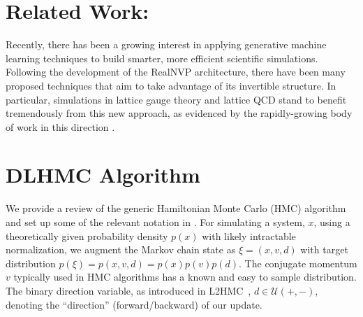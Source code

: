 \documentclass{article} %
\begin{document}
\section{\label{sec:related_work}Related Work:}
Recently, there has been a growing interest in applying generative machine learning techniques to build smarter, more efficient scientific simulations.
%
Following the development of the RealNVP \citep{dinhRealNVP} architecture, there have been many proposed techniques that aim to take advantage of its invertible structure.
%
In particular, simulations in lattice gauge theory and lattice QCD stand to benefit tremendously from this new approach, as evidenced by the rapidly-growing body of work in this direction 
\citep{%
   albergo2019flow,albergo2021introduction,favoni2020lattice,medvidovic2020generative,neklyudov2020orbital,
   neklyudov2020involutive, li2020neural,boyda2020sampling,kanwar2020equivariant,toth2019hamiltonian,
   hoffman2019neutra,wehenkel2020you,pasarica2010adaptively, dinhRealNVP,tanaka2017towards,
   rezende2020normalizing%
}.

\section{\label{sec:method}DLHMC Algorithm}
%
We provide a review of the generic Hamiltonian Monte Carlo (HMC) algorithm and set up some of the relevant notation in
.
%
For simulating a system, $x$, using a theoretically given probability density $p(x)$ with likely intractable normalization,
we augment the Markov chain state as
\(\xi = (x, v, d)\) with target distribution \(p(\xi) = p(x, v, d) = p(x) p(v) p(d)\).
The conjugate momentum $v$ typically used in HMC algorithms has a known and easy to sample distribution.
%
The binary direction variable, as introduced in L2HMC~\citep{levy2017},
\(d\in\mathcal{U}(+,-)\), %
denoting the ``direction'' (forward/backward) of our update.
%
%
\end{document}
